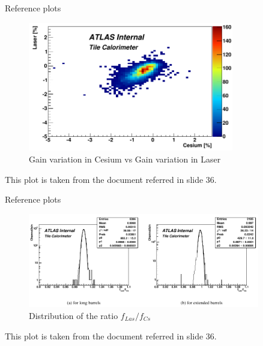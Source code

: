 \documentclass{beamer}
\begin{document}
\begin{frame}{Reference plots}
\begin{figure}
 \centering
 \includegraphics[width=0.8\textwidth]{crop.pdf}
 \caption{Gain variation in Cesium vs Gain variation in Laser}
  	\end{figure}
This plot is taken from the document referred in slide 36.

 	\end{frame}
\begin{frame}{Reference plots}
\begin{figure}
 \centering
 \includegraphics[width=0.9\textwidth]{crop1.pdf}
 \caption{Distribution of the ratio $f_{Las}/f_{Cs}$}
 \end{figure}
 This plot is taken from the document referred in slide 36.

 	\end{frame}
\end{document}
